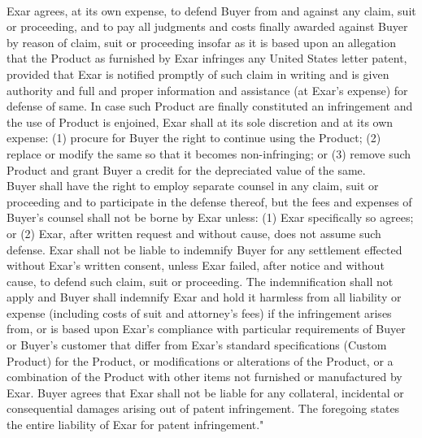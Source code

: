 {  \noindent{\small\textbf{\textcolor{ThemeColor}{Patent Infringement - Indemnification}}}\\[.5ex]

  {\scriptsize\noindent{}Exar agrees, at its own expense, to defend Buyer from and against any
  claim, suit or proceeding, and to pay all judgments and costs finally
  awarded against Buyer by reason of claim, suit or proceeding insofar
  as it is based upon an allegation that the Product as furnished by
  Exar infringes any United States letter patent, provided that Exar is
  notified promptly of such claim in writing and is given authority and
  full and proper information and assistance (at Exar's expense) for
  defense of same.  In case such Product are finally constituted an
  infringement and the use of Product is enjoined, Exar shall at its
  sole discretion and at its own expense: (1) procure for Buyer the
  right to continue using the Product; (2) replace or modify the same so
  that it becomes non-infringing; or (3) remove such Product and grant
  Buyer a credit for the depreciated value of the same.}\\[.5ex]

  {\scriptsize\noindent{}Buyer shall have the right to employ separate counsel in any claim,
  suit or proceeding and to participate in the defense thereof, but the
  fees and expenses of Buyer's counsel shall not be borne by Exar
  unless: (1) Exar specifically so agrees; or (2) Exar, after written
  request and without cause, does not assume such defense.  Exar shall
  not be liable to indemnify Buyer for any settlement effected without
  Exar's written consent, unless Exar failed, after notice and without
  cause, to defend such claim, suit or proceeding.  The indemnification
  shall not apply and Buyer shall indemnify Exar and hold it harmless
  from all liability or expense (including costs of suit and attorney's
  fees) if the infringement arises from, or is based upon Exar's
  compliance with particular requirements of Buyer or Buyer's customer
  that differ from Exar's standard specifications (Custom Product) for
  the Product, or modifications or alterations of the Product, or a
  combination of the Product with other items not furnished or
  manufactured by Exar.  Buyer agrees that Exar shall not be liable for
  any collateral, incidental or consequential damages arising out of
  patent infringement.  The foregoing states the entire liability of
  Exar for patent infringement."}\\[.5ex]

  \pagebreak
  \noindent{\small\textbf{\textcolor{ThemeColor}{Motorola}}}\\[.5ex]

}
